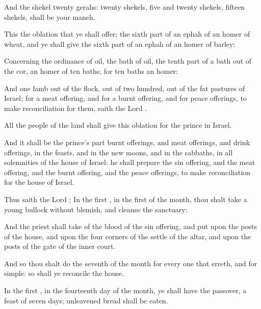 {And the
shekel
{}
twenty
gerahs:
twenty
shekels,
five and
twenty
shekels,
fifteen
shekels, shall be your
maneh.


\par }{\PP {}This
{} the
oblation that ye shall
offer; the sixth
part of an
ephah of an
homer of
wheat, and ye shall give the sixth
part of an
ephah of an
homer of
barley:

Concerning the
ordinance of
oil, the
bath of
oil,
{} the tenth
part of a
bath out of the
cor,
{} an
homer of
ten
baths; for
ten
baths
{} an
homer:

And
one
lamb out of the
flock, out of two
hundred, out of the fat
pastures of
Israel; for a meat
offering, and for a burnt
offering, and for peace
offerings, to make
reconciliation for them,
saith the
Lord
{}.

All the
people of the
land shall give this
oblation for the
prince in
Israel.

And it shall be the
prince’s part
{} burnt
offerings, and meat
offerings, and drink
offerings, in the
feasts, and in the new
moons, and in the
sabbaths, in all
solemnities of the
house of
Israel: he shall
prepare the sin
offering, and the meat
offering, and the burnt
offering, and the peace
offerings, to make
reconciliation for the
house of
Israel.

Thus
saith the
Lord
{}; In the
first
{}, in the
first
{} of the
month, thou shalt
take a
young
bullock without
blemish, and
cleanse the
sanctuary:

And the
priest shall
take of the
blood of the sin
offering, and
put
{} upon the
posts of the
house, and upon the
four
corners of the
settle of the
altar, and upon the
posts of the
gate of the
inner
court.

And so thou shalt
do the
seventh
{} of the
month for every
one that
erreth, and for
{}
simple: so shall ye
reconcile the
house.

In the
first
{}, in the
fourteenth
day of the
month, ye shall have the
passover, a
feast of
seven
days; unleavened
bread shall be
eaten.

}

